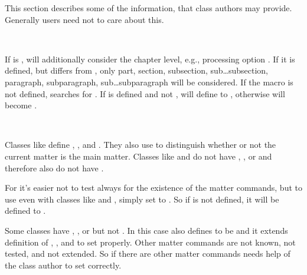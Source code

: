 This section describes some of the information, that class authors may
provide. Generally users need not to care about this.

\begin{Declaration}
  \ \ \ %
  \ %
\end{Declaration}
If  is ,  will additionally
consider the chapter level, e.g., processing option
. If it is defined, but differs from
, only part, section, subsection, sub\dots subsection,
paragraph, subparagraph, sub\dots subparagraph will be considered. If the
macro is not defined,  searches for
. If  is defined and
not ,  will define  to
, otherwise  will become .%
\EndIndexGroup


\begin{Declaration}
  \ \ \ %
  \ %
\end{Declaration}
Classes like  define ,
, and . They
also use  to distinguish whether or not the current
matter is the main matter. Classes like  and  do
not have , ,
or  and therefore also do not have
.

For  it's easier not to test always for the existence of the
matter commands, but to use  even with classes like
 and , simply set to . So if
 is not defined, it will be defined to .

Some classes have ,
, or  but not
. In this case  also defines
 to be  and it extends definition of
, , and
 to set  properly. Other
matter commands are not known, not tested, and not extended. So if there are
other matter commands  needs help of the class author to set
 correctly.%
\EndIndexGroup


